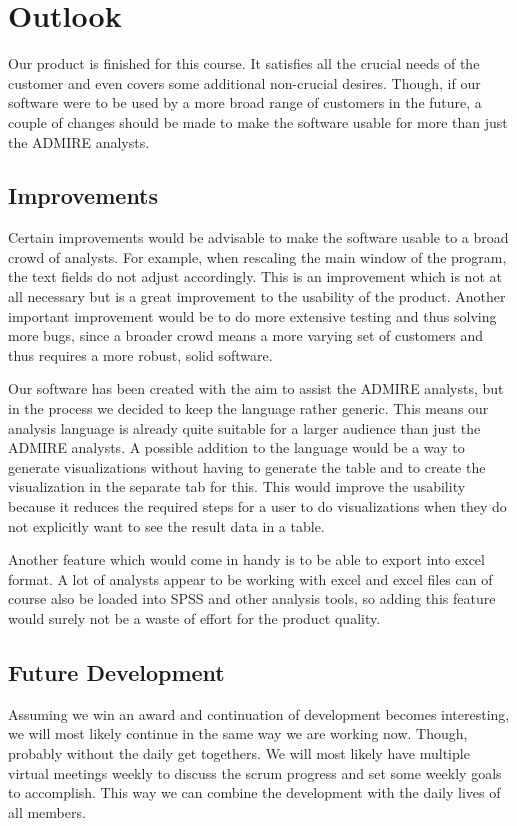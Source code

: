 \chapter{Outlook} %

Our product is finished for this course. It satisfies all the crucial needs of the customer and even covers some additional non-crucial desires. Though, if our software were to be used by a more broad range of customers in the future, a couple of changes should be made to make the software usable for more than just the ADMIRE analysts.

\section{Improvements}
Certain improvements would be advisable to make the software usable to a broad crowd of analysts. For example, when rescaling the main window of the program, the text fields do not adjust accordingly. This is an improvement which is not at all necessary but is a great improvement to the usability of the product. Another important improvement would be to do more extensive testing and thus solving more bugs, since a broader crowd means a more varying set of customers and thus requires a more robust, solid software.

Our software has been created with the aim to assist the ADMIRE analysts, but in the process we decided to keep the language rather generic. This means our analysis language is already quite suitable for a larger audience than just the ADMIRE analysts. A possible addition to the language would be a way to generate visualizations without having to generate the table and to create the visualization in the separate tab for this. This would improve the usability because it reduces the required steps for a user to do visualizations when they do not explicitly want to see the result data in a table.

Another feature which would come in handy is to be able to export into excel format. A lot of analysts appear to be working with excel and excel files can of course also be loaded into SPSS and other analysis tools, so adding this feature would surely not be a waste of effort for the product quality.

\section{Future Development}
Assuming we win an award and continuation of development becomes interesting, we will most likely continue in the same way we are working now. Though, probably without the daily get togethers. We will most likely have multiple virtual meetings weekly to discuss the scrum progress and set some weekly goals to accomplish. This way we can combine the development with the daily lives of all members.